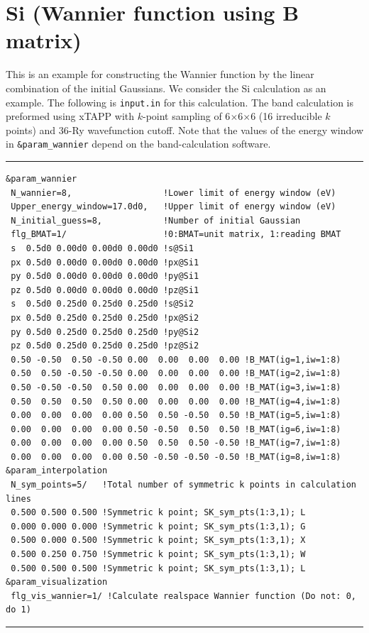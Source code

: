 \documentclass{article}
\begin{document}
\section{\label{Si}Si (Wannier function using B matrix)} 
This is an example for constructing the Wannier function by the linear combination of the initial Gaussians. We consider the Si calculation as an example. The following is \verb+input.in+ for this calculation. The band calculation is preformed using {\sc xTAPP} with $k$-point sampling of 6$\times$6$\times$6 (16 irreducible $k$ points) and 36-Ry wavefunction cutoff. Note that the values of the energy window in {\tt \&param\_wannier} depend on the band-calculation software.
\vspace{3mm}\hrule
\begin{verbatim}
&param_wannier 
 N_wannier=8,                  !Lower limit of energy window (eV)
 Upper_energy_window=17.0d0,   !Upper limit of energy window (eV)
 N_initial_guess=8,            !Number of initial Gaussian
 flg_BMAT=1/                   !0:BMAT=unit matrix, 1:reading BMAT      
 s  0.5d0 0.00d0 0.00d0 0.00d0 !s@Si1
 px 0.5d0 0.00d0 0.00d0 0.00d0 !px@Si1
 py 0.5d0 0.00d0 0.00d0 0.00d0 !py@Si1
 pz 0.5d0 0.00d0 0.00d0 0.00d0 !pz@Si1
 s  0.5d0 0.25d0 0.25d0 0.25d0 !s@Si2
 px 0.5d0 0.25d0 0.25d0 0.25d0 !px@Si2
 py 0.5d0 0.25d0 0.25d0 0.25d0 !py@Si2
 pz 0.5d0 0.25d0 0.25d0 0.25d0 !pz@Si2
 0.50 -0.50  0.50 -0.50 0.00  0.00  0.00  0.00 !B_MAT(ig=1,iw=1:8)
 0.50  0.50 -0.50 -0.50 0.00  0.00  0.00  0.00 !B_MAT(ig=2,iw=1:8)
 0.50 -0.50 -0.50  0.50 0.00  0.00  0.00  0.00 !B_MAT(ig=3,iw=1:8)
 0.50  0.50  0.50  0.50 0.00  0.00  0.00  0.00 !B_MAT(ig=4,iw=1:8)
 0.00  0.00  0.00  0.00 0.50  0.50 -0.50  0.50 !B_MAT(ig=5,iw=1:8)
 0.00  0.00  0.00  0.00 0.50 -0.50  0.50  0.50 !B_MAT(ig=6,iw=1:8)
 0.00  0.00  0.00  0.00 0.50  0.50  0.50 -0.50 !B_MAT(ig=7,iw=1:8)
 0.00  0.00  0.00  0.00 0.50 -0.50 -0.50 -0.50 !B_MAT(ig=8,iw=1:8)
&param_interpolation   
 N_sym_points=5/   !Total number of symmetric k points in calculation lines
 0.500 0.500 0.500 !Symmetric k point; SK_sym_pts(1:3,1); L
 0.000 0.000 0.000 !Symmetric k point; SK_sym_pts(1:3,1); G
 0.500 0.000 0.500 !Symmetric k point; SK_sym_pts(1:3,1); X
 0.500 0.250 0.750 !Symmetric k point; SK_sym_pts(1:3,1); W
 0.500 0.500 0.500 !Symmetric k point; SK_sym_pts(1:3,1); L
&param_visualization   
 flg_vis_wannier=1/ !Calculate realspace Wannier function (Do not: 0, do 1)  
\end{verbatim}
\hrule\vspace{3mm}
\end{document}
